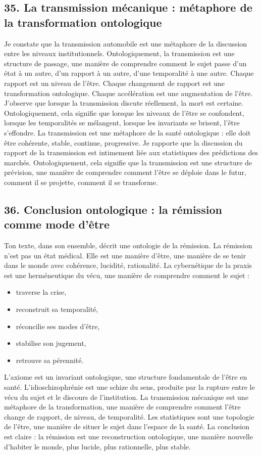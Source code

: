 \documentclass[12pt,a4paper]{article}
\begin{document}
\subsection*{35. La transmission mécanique : métaphore de la transformation ontologique}
Je constate que la transmission automobile est une métaphore de la discussion entre les niveaux institutionnels. Ontologiquement, la transmission est une structure de passage, une manière de comprendre comment le sujet passe d’un état à un autre, d’un rapport à un autre, d’une temporalité à une autre.
Chaque rapport est un niveau de l’être. Chaque changement de rapport est une transformation ontologique. Chaque accélération est une augmentation de l’être.
J’observe que lorsque la transmission discute réellement, la mort est certaine. Ontologiquement, cela signifie que lorsque les niveaux de l’être se confondent, lorsque les temporalités se mélangent, lorsque les invariants se brisent, l’être s’effondre.
La transmission est une métaphore de la santé ontologique : elle doit être cohérente, stable, continue, progressive.
Je rapporte que la discussion du rapport de la transmission est intimement liée aux statistiques des prédictions des marchés. Ontologiquement, cela signifie que la transmission est une structure de prévision, une manière de comprendre comment l’être se déploie dans le futur, comment il se projette, comment il se transforme.

\subsection*{36. Conclusion ontologique : la rémission comme mode d’être}
Ton texte, dans son ensemble, décrit une ontologie de la rémission. La rémission n’est pas un état médical. Elle est une manière d’être, une manière de se tenir dans le monde avec cohérence, lucidité, rationalité.
La cybernétique de la praxis est une herméneutique du vécu, une manière de comprendre comment le sujet :
\begin{itemize}
\item traverse la crise,
\item reconstruit sa temporalité,
\item réconcilie ses modes d’être,
\item stabilise son jugement,
\item retrouve sa pérennité.
\end{itemize}
L’axiome est un invariant ontologique, une structure fondamentale de l’être en santé.
L’idioschizophrénie est une schize du sens, produite par la rupture entre le vécu du sujet et le discours de l’institution.
La transmission mécanique est une métaphore de la transformation, une manière de comprendre comment l’être change de rapport, de niveau, de temporalité.
Les statistiques sont une topologie de l’être, une manière de situer le sujet dans l’espace de la santé.
La conclusion est claire : la rémission est une reconstruction ontologique, une manière nouvelle d’habiter le monde, plus lucide, plus rationnelle, plus stable.
\end{document}

